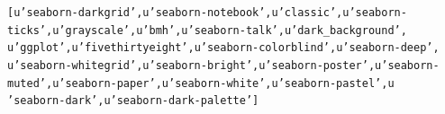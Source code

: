 \documentclass[letterpaper,10pt,english]{/usr/share/sphinx/texinputs/sphinxhowto}
\newenvironment{InvisibleVerbatim}
        {\begin{mdframed}[leftmargin=0.1\linewidth,innerleftmargin=3pt,innerrightmargin=3pt, userdefinedwidth=1\linewidth, linewidth=0pt, linecolor=white, usetwoside=false]}
        {\end{mdframed}}
\begin{document}
        

            
                \begin{InvisibleVerbatim}
                \vspace{-0.5\baselineskip}
\begin{alltt}[u'seaborn-darkgrid', u'seaborn-notebook', u'classic', u'seaborn-
ticks', u'grayscale', u'bmh', u'seaborn-talk', u'dark\_background',
u'ggplot', u'fivethirtyeight', u'seaborn-colorblind', u'seaborn-deep',
u'seaborn-whitegrid', u'seaborn-bright', u'seaborn-poster', u'seaborn-
muted', u'seaborn-paper', u'seaborn-white', u'seaborn-pastel', u
'seaborn-dark', u'seaborn-dark-palette']
\end{alltt}

            \end{InvisibleVerbatim}
            
        
    


\end{document}
